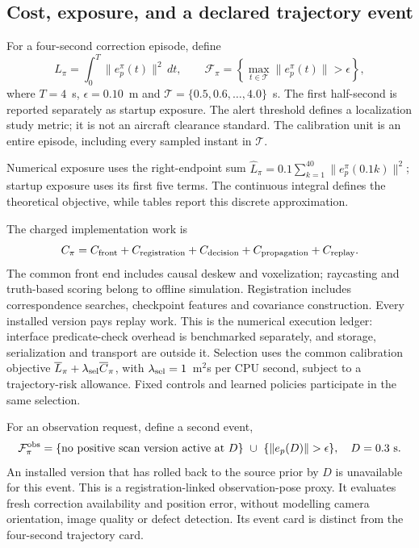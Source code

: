 \subsection{Cost, exposure, and a declared trajectory event}
For a four-second correction episode, define
\begin{equation}
L_\pi=\int_0^T\|e_p^\pi(t)\|^2\,dt,\qquad
\mathcal F_\pi=\left\{\max_{t\in\mathcal T}\|e_p^\pi(t)\|>\epsilon\right\},\label{eq:episode-event}
\end{equation}
where $T=4$~s, $\epsilon=0.10$~m and $\mathcal T=\{0.5,0.6,\ldots,4.0\}$~s. The first half-second is reported separately as startup exposure. The alert threshold defines a localization study metric; it is not an aircraft clearance standard. The calibration unit is an entire episode, including every sampled instant in $\mathcal T$.

Numerical exposure uses the right-endpoint sum $\widehat L_\pi=0.1\sum_{k=1}^{40}\|e_p^\pi(0.1k)\|^2$; startup exposure uses its first five terms. The continuous integral defines the theoretical objective, while tables report this discrete approximation.


The charged implementation work is
\begin{equation}
C_\pi=C_{\rm front}+C_{\rm registration}+C_{\rm decision}
+C_{\rm propagation}+C_{\rm replay}.\label{eq:cost}
\end{equation}
The common front end includes causal deskew and voxelization; raycasting and truth-based scoring belong to offline simulation. Registration includes correspondence searches, checkpoint features and covariance construction. Every installed version pays replay work. This is the numerical execution ledger: interface predicate-check overhead is benchmarked separately, and storage, serialization and transport are outside it. Selection uses the common calibration objective $\overline L_\pi+\lambda_{\rm sel}\overline C_\pi$, with $\lambda_{\rm sel}=1$~m$^2$s per CPU second, subject to a trajectory-risk allowance. Fixed controls and learned policies participate in the same selection.

For an observation request, define a second event,
\begin{equation}
\mathcal F_\pi^{\rm obs}=\{\text{no positive scan version active at }D\}
\ \cup\ \{\|e_p(D)\|>\epsilon\},\quad D=0.3\ {\rm s}.\label{eq:observation-event}
\end{equation}
An installed version that has rolled back to the source prior by $D$ is unavailable for this event. This is a registration-linked observation-pose proxy. It evaluates fresh correction availability and position error, without modelling camera orientation, image quality or defect detection. Its event card is distinct from the four-second trajectory card.

